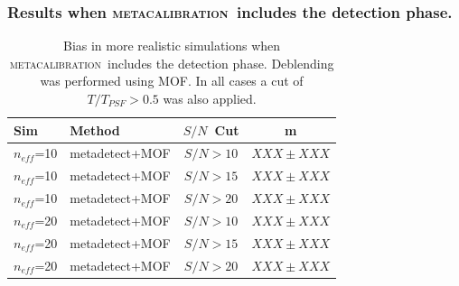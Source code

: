 \documentclass{beamer}
\newcommand{\mcal}{\textsc{metacalibration}}
\newcommand{\snr}{$S/N$}
\newcommand{\neff}{$n_{eff}$}
\begin{document}
\begin{frame}
    \frametitle{Results when \mcal\ includes the detection phase.}

 
    \begin{table}
        \centering
        \begin{tabular}{|l|l|c|c|}
            \hline
            Sim & Method         & \snr\ Cut & m             \\
            \hline

            \hline
            \neff=10    & metadetect+MOF    & \snr$ > 10$ & $XXX \pm XXX$  \\
            \neff=10    & metadetect+MOF    & \snr$ > 15$ & $XXX \pm XXX$  \\
            \neff=10    & metadetect+MOF    & \snr$ > 20$ & $XXX \pm XXX$  \\
            \hline
            \neff=20    & metadetect+MOF    & \snr$ > 10$ & $XXX \pm XXX$  \\
            \neff=20    & metadetect+MOF    & \snr$ > 15$ & $XXX \pm XXX$  \\
            \neff=20    & metadetect+MOF    & \snr$ > 20$ & $XXX \pm XXX$  \\
            \hline

        \end{tabular}
        \caption{Bias in more realistic simulations when \mcal\ includes
            the detection phase.  Deblending was performed using MOF. 
            In all cases a cut of $T/T_{PSF} > 0.5$ was also applied.
        \label{tab:mcal:deblending}}
    \end{table}


\end{frame}
\end{document}
